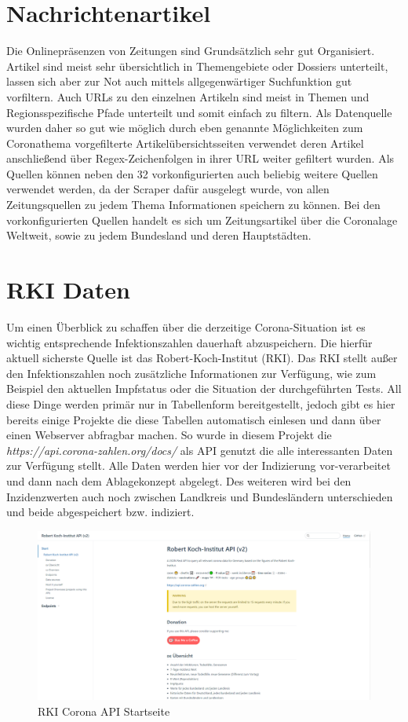 \documentclass[12pt,oneside,a4paper,parskip]{scrbook}
\begin{document}
\section{Nachrichtenartikel}
Die Onlinepräsenzen von Zeitungen sind Grundsätzlich sehr gut Organisiert. Artikel sind meist sehr übersichtlich in Themengebiete oder Dossiers unterteilt, lassen sich aber zur Not auch mittels allgegenwärtiger Suchfunktion gut vorfiltern. Auch URLs zu den einzelnen Artikeln sind meist in Themen und Regionsspezifische Pfade unterteilt und somit einfach zu filtern. Als Datenquelle wurden daher so gut wie möglich durch eben genannte Möglichkeiten zum Coronathema vorgefilterte Artikelübersichtsseiten verwendet deren Artikel anschließend über Regex-Zeichenfolgen in ihrer URL weiter gefiltert wurden. Als Quellen können neben den 32 vorkonfigurierten auch beliebig weitere Quellen verwendet werden, da der Scraper dafür ausgelegt wurde, von allen Zeitungsquellen zu jedem Thema Informationen speichern zu können. Bei den vorkonfigurierten Quellen handelt es sich um Zeitungsartikel über die Coronalage Weltweit, sowie zu jedem Bundesland und deren Hauptstädten.
\section{RKI Daten}
Um einen \"Uberblick zu schaffen \"uber die derzeitige Corona-Situation ist es wichtig entsprechende Infektionszahlen dauerhaft abzuspeichern. Die hierf\"ur aktuell sicherste Quelle ist das Robert-Koch-Institut (RKI). Das RKI stellt außer den Infektionszahlen noch zus\"atzliche Informationen zur Verf\"ugung, wie zum Beispiel den aktuellen Impfstatus oder die Situation der durchgef\"uhrten Tests.\newline
All diese Dinge werden prim\"ar nur in Tabellenform bereitgestellt, jedoch gibt es hier bereits einige Projekte die diese Tabellen automatisch einlesen und dann \"uber einen Webserver abfragbar machen. So wurde in diesem Projekt die \textit{https://api.corona-zahlen.org/docs/} als API genutzt die alle interessanten Daten zur Verf\"ugung stellt. \newline
Alle Daten werden hier vor der Indizierung vor-verarbeitet und dann nach dem Ablagekonzept abgelegt.
Des weiteren wird bei den Inzidenzwerten auch noch zwischen Landkreis und Bundesl\"andern unterschieden und beide abgespeichert bzw. indiziert.
\begin{figure}[H]
	\centering
	\includegraphics[scale=0.4]{rkiapiOverview.png}
	\captionsetup{justification=centering}
	\caption{RKI Corona API Startseite}
	\label{pic:rkiapiOverview}
\end{figure}
\pagebreak
\end{document}
